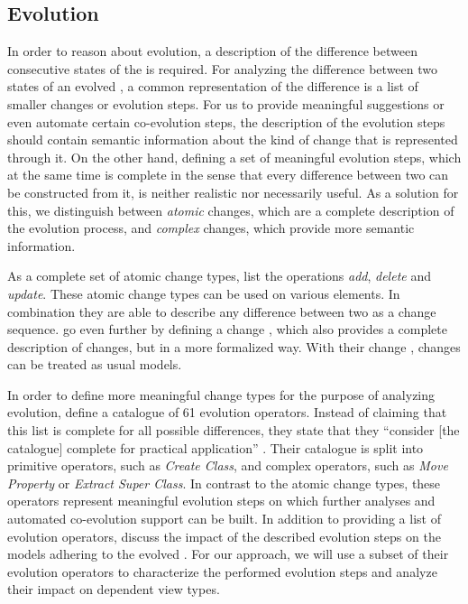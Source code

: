 \subsection{\Metamodel Evolution}
\label{sec:MetaModelEvolution}

In order to reason about \metamodel evolution, a description of the difference between consecutive states of the \metamodel is required.
For analyzing the difference between two states of an evolved \metamodel, a common representation of the difference is a list of smaller changes or evolution steps.
For us to provide meaningful suggestions or even automate certain co-evolution steps, the description of the evolution steps should contain semantic information about the kind of change that is represented through it.
On the other hand, defining a set of meaningful evolution steps, which at the same time is complete in the sense that every difference between two \metamodels can be constructed from it, is neither realistic nor necessarily useful.
As a solution for this, we distinguish between \emph{atomic} \metamodel changes, which are a complete description of the evolution process, and \emph{complex} changes, which provide more semantic information.

As a complete set of atomic change types, \textcite{khelladi_detecting_2015} list the operations \emph{add}, \emph{delete} and \emph{update}.
These atomic change types can be used on various \metamodel elements.
In combination they are able to describe any difference between two \metamodels as a change sequence.
\textcite{burger_change_2010} go even further by defining a change \metamodel, which also provides a complete description of \metamodel changes, but in a more formalized way.
With their change \metamodel, \metamodel changes can be treated as usual models.

In order to define more meaningful change types for the purpose of analyzing \metamodel evolution, \textcite{herrmannsdoerfer_extensive_2011} define a catalogue of 61 \metamodel evolution operators.
Instead of claiming that this list is complete for all possible \metamodel differences, they state that they ``consider [the catalogue] complete for practical application'' \autocite{herrmannsdoerfer_extensive_2011}.
Their catalogue is split into primitive operators, such as \emph{Create Class}, and complex operators, such as \emph{Move Property} or \emph{Extract Super Class}.
In contrast to the atomic change types, these operators represent meaningful evolution steps on which further analyses and automated co-evolution support can be built.
In addition to providing a list of \metamodel evolution operators, \textcite{herrmannsdoerfer_extensive_2011} discuss the impact of the described evolution steps on the models adhering to the evolved \metamodels.
For our approach, we will use a subset of their evolution operators to characterize the performed evolution steps and analyze their impact on dependent view types.

